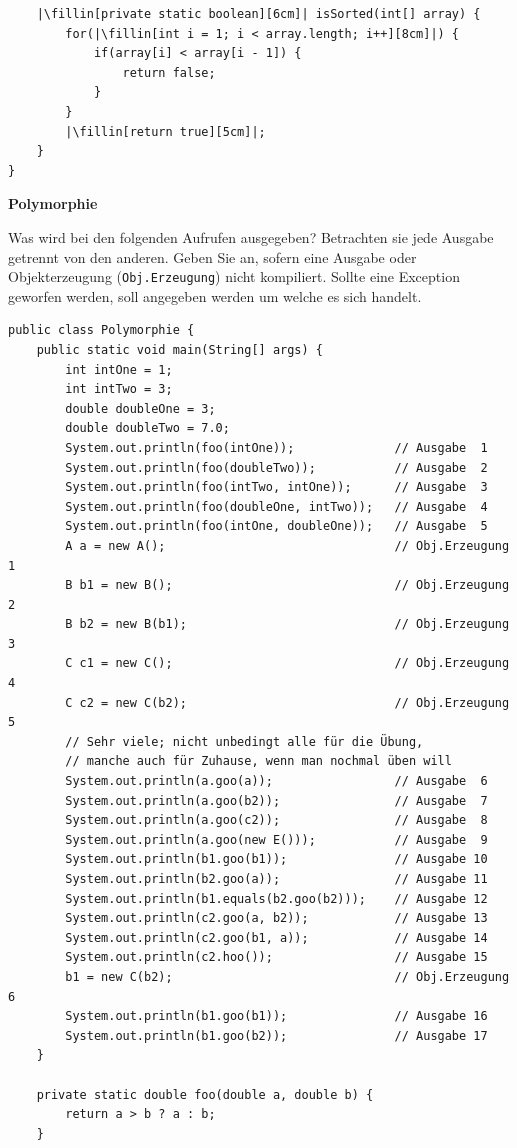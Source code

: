\documentclass[11pt]{exam} %
\begin{document}
\begin{questions}
\begin{minipage}{\linewidth}
\begin{verbatim}
	|\fillin[private static boolean][6cm]| isSorted(int[] array) {
		for(|\fillin[int i = 1; i < array.length; i++][8cm]|) {
			if(array[i] < array[i - 1]) {
				return false;
			}
		}
		|\fillin[return true][5cm]|;
	}
}
\end{verbatim}
\end{minipage}
\question \textbf{Polymorphie}\par\nobreak Was wird bei den folgenden Aufrufen ausgegeben? Betrachten sie jede Ausgabe getrennt von den anderen. Geben Sie an, sofern eine Ausgabe oder Objekterzeugung (\texttt{Obj.Erzeugung}) nicht kompiliert. Sollte eine Exception geworfen werden, soll angegeben werden um welche es sich handelt.
\begin{verbatim}
public class Polymorphie {
	public static void main(String[] args) {
		int intOne = 1;
		int intTwo = 3;
		double doubleOne = 3;
		double doubleTwo = 7.0;
		System.out.println(foo(intOne));              // Ausgabe  1
		System.out.println(foo(doubleTwo));           // Ausgabe  2
		System.out.println(foo(intTwo, intOne));      // Ausgabe  3
		System.out.println(foo(doubleOne, intTwo));   // Ausgabe  4
		System.out.println(foo(intOne, doubleOne));   // Ausgabe  5
		A a = new A();                                // Obj.Erzeugung 1
		B b1 = new B();                               // Obj.Erzeugung 2
		B b2 = new B(b1);                             // Obj.Erzeugung 3
		C c1 = new C();                               // Obj.Erzeugung 4
		C c2 = new C(b2);                             // Obj.Erzeugung 5
		// Sehr viele; nicht unbedingt alle für die Übung,
		// manche auch für Zuhause, wenn man nochmal üben will
		System.out.println(a.goo(a));                 // Ausgabe  6
		System.out.println(a.goo(b2));                // Ausgabe  7
		System.out.println(a.goo(c2));                // Ausgabe  8
		System.out.println(a.goo(new E()));           // Ausgabe  9
		System.out.println(b1.goo(b1));               // Ausgabe 10
		System.out.println(b2.goo(a));                // Ausgabe 11
		System.out.println(b1.equals(b2.goo(b2)));    // Ausgabe 12
		System.out.println(c2.goo(a, b2));            // Ausgabe 13
		System.out.println(c2.goo(b1, a));            // Ausgabe 14
		System.out.println(c2.hoo());                 // Ausgabe 15
		b1 = new C(b2);                               // Obj.Erzeugung 6
		System.out.println(b1.goo(b1));               // Ausgabe 16
		System.out.println(b1.goo(b2));               // Ausgabe 17
	}

	private static double foo(double a, double b) {
		return a > b ? a : b;
	}


\end{verbatim}
\end{questions}
\end{document}
